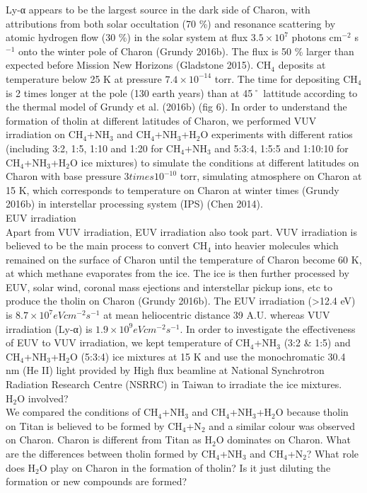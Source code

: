 Ly-α appears to be the largest source in the dark side of Charon, with attributions from both solar occultation (70 \%) and resonance scattering by atomic hydrogen flow (30 \%) in the solar system at flux $3.5 \times 10^7$ photons cm$^{-2}$ s$^{-1}$ onto the winter pole of Charon (Grundy 2016b). The flux is 50 \% larger than expected before Mission New Horizons (Gladstone 2015). CH$_4$ deposits at temperature below 25 K at pressure $7.4 \times 10^{-14}$ torr. The time for depositing CH$_4$ is 2 times longer at the pole (130 earth years) than at 45˚ lattitude according to the thermal model of Grundy et al. (2016b) (fig 6). In order to understand the formation of tholin at different latitudes of Charon, we performed VUV irradiation on CH$_4$+NH$_3$ and CH$_4$+NH$_3$+H$_2$O experiments with different ratios (including 3:2, 1:5, 1:10 and 1:20 for CH$_4$+NH$_3$ and 5:3:4, 1:5:5 and 1:10:10 for CH$_4$+NH$_3$+H$_2$O ice mixtures) to simulate the conditions at different latitudes on Charon with base pressure $3 times 10^{-10}$ torr, simulating atmosphere on Charon at 15 K, which corresponds to temperature on Charon at winter times (Grundy 2016b) in interstellar processing system (IPS) (Chen 2014).\\
EUV irradiation\\
Apart from VUV irradiation, EUV irradiation also took part. VUV irradiation is believed to be the main process to convert CH$_4$ into heavier molecules which remained on the surface of Charon until the temperature of Charon become 60 K, at which methane evaporates from the ice. The ice is then further processed by EUV, solar wind, coronal mass ejections and interstellar pickup ions, etc to produce the tholin on Charon (Grundy 2016b). The EUV irradiation (>12.4 eV) is $8.7 \times 10^7 eV cm^{-2} s^{-1}$ at mean heliocentric distance 39 A.U. whereas VUV irradiation (Ly-α) is $1.9 \times 10^9 eV cm^{-2} s^{-1}$. In order to investigate the effectiveness of EUV to VUV irradiation, we kept temperature of CH$_4$+NH$_3$ (3:2 \& 1:5) and CH$_4$+NH$_3$+H$_2$O (5:3:4) ice mixtures at 15 K and use the monochromatic 30.4 nm (He II) light provided by High flux beamline at National Synchrotron Radiation Research Centre (NSRRC) in Taiwan to irradiate the ice mixtures.\\
H$_2$O involved?\\
We compared the conditions of CH$_4$+NH$_3$ and CH$_4$+NH$_3$+H$_2$O because tholin on Titan is believed to be formed by CH$_4$+N$_2$ and a similar colour was observed on Charon. Charon is different from Titan as H$_2$O dominates on Charon. What are the differences between tholin formed by CH$_4$+NH$_3$ and CH$_4$+N$_2$? What role does H$_2$O play on Charon in the formation of tholin? Is it just diluting the formation or new compounds are formed?\\
